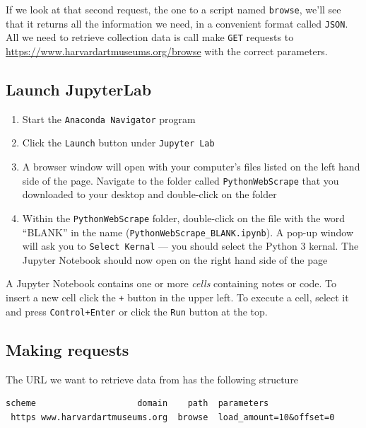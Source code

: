 \documentclass[
]{book}
\providecommand{\tightlist}{%
  \setlength{\itemsep}{0pt}\setlength{\parskip}{0pt}}
\begin{document}
If we look at that second request, the one to a script named
\texttt{browse}, we'll see that it returns all the information we need, in
a convenient format called \texttt{JSON}. All we need to retrieve collection
data is call make \texttt{GET} requests to
\url{https://www.harvardartmuseums.org/browse} with the correct
parameters.

\hypertarget{launch-jupyterlab-2}{%
\subsection{Launch JupyterLab}\label{launch-jupyterlab-2}}

\begin{enumerate}
\def\labelenumi{\arabic{enumi}.}
\tightlist
\item
  Start the \texttt{Anaconda\ Navigator} program
\item
  Click the \texttt{Launch} button under \texttt{Jupyter\ Lab}
\item
  A browser window will open with your computer's files listed on the left hand side of the page. Navigate to the folder called \texttt{PythonWebScrape} that you downloaded to your desktop and double-click on the folder
\item
  Within the \texttt{PythonWebScrape} folder, double-click on the file with the word ``BLANK'' in the name (\texttt{PythonWebScrape\_BLANK.ipynb}). A pop-up window will ask you to \texttt{Select\ Kernal} --- you should select the Python 3 kernal. The Jupyter Notebook should now open on the right hand side of the page
\end{enumerate}

A Jupyter Notebook contains one or more \emph{cells} containing notes or code. To insert a new cell click the \texttt{+} button in the upper left. To execute a cell, select it and press \texttt{Control+Enter} or click the \texttt{Run} button at the top.

\hypertarget{making-requests}{%
\subsection{Making requests}\label{making-requests}}

The URL we want to retrieve data from has the following structure

\begin{verbatim}
scheme                    domain    path  parameters
 https www.harvardartmuseums.org  browse  load_amount=10&offset=0
\end{verbatim}
\end{document}
